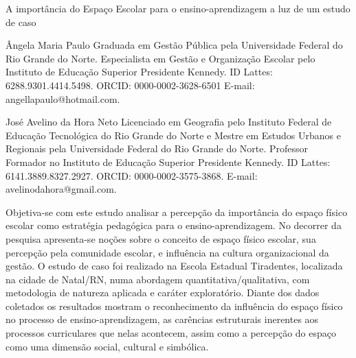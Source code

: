 \begin{refsection}
    \renewcommand{\thefigure}{\arabic{figure}}
    \renewcommand{\thetable}{\arabic{table}}
    
    \chapterOneLine
    {A importância do Espaço Escolar para o ensino-aprendizagem a luz de um estudo de caso }
    \label{chap:imprtancia-espaco-e}

    \articleAuthor
    {Ângela Maria Paulo}
    {Graduada em Gestão Pública pela Universidade Federal do Rio Grande do Norte. Especialista em Gestão e Organização Escolar pelo Instituto de Educação Superior Presidente Kennedy. ID Lattes: 6288.9301.4414.5498. ORCID: 0000-0002-3628-6501 E-mail: angella\textunderscore{}paulo@hotmail.com.}
    
    \articleAuthor
    {José Avelino da Hora Neto}
    {Licenciado em Geografia pelo Instituto Federal de Educação Tecnológica do Rio Grande do Norte e Mestre em Estudos Urbanos e Regionais pela Universidade Federal do Rio Grande do Norte. Professor Formador no Instituto de Educação Superior Presidente Kennedy. ID Lattes: 6141.3889.8327.2927. ORCID: 0000-0002-3575-3868. E-mail: avelinodahora@gmail.com.}
    
    \begin{galoResumo}
        Objetiva-se com este estudo analisar a percepção da importância do espaço físico escolar como estratégia pedagógica para o ensino-aprendizagem. No decorrer da pesquisa apresenta-se noções sobre o conceito de espaço físico escolar, sua percepção pela comunidade escolar, e influência na cultura organizacional da gestão. O estudo de caso foi realizado na Escola Estadual Tiradentes, localizada na cidade de Natal/RN, numa abordagem quantitativa/qualitativa, com metodologia de natureza aplicada e caráter exploratório. Diante dos dados coletados os resultados mostram o reconhecimento da influência do espaço físico no processo de ensino-aprendizagem, as carências estruturais inerentes aos processos curriculares que nelas acontecem, assim como a percepção do espaço como uma dimensão social, cultural e simbólica.    
    \end{galoResumo}
    

\end{refsection}
